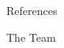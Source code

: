 \documentclass[final]{beamer}
\begin{document}
\begin{frame}{}
\begin{columns}[t]
\begin{column}{.45\linewidth}
\begin{block}{References}
\end{block}    

\begin{block}{The Team}


\end{block}    

\vfill


\end{column}


\end{columns}

\vfill

\end{frame}
\end{document}
